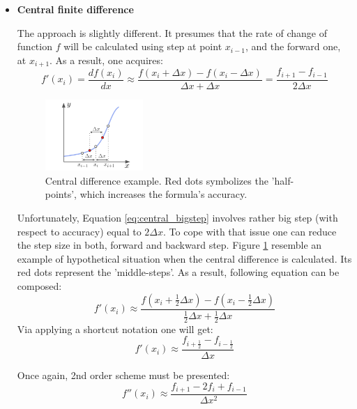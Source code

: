 \documentclass{report}
\begin{document}
\begin{itemize}
\item \textbf{Central finite difference}

The approach is slightly different. It presumes that the rate of change of function $f$ will be calculated using step at point $x_{i-1}$, and the forward one, at $x_{i+1}$. As a result, one acquires:
\begin{equation} \label{eq:central_bigstep}
f'(x_i) = \frac{df(x_i)}{dx} \approx \frac{f(x_i + \Delta x) -f(x_i - \Delta x)}{\Delta x + \Delta x} = \frac{f_{i+1} - f_{i-1}}{2\Delta x}
\end{equation}

\begin{figure}[H]
    \centering
    \includegraphics[width=0.35\textwidth]{images/central_diff.pdf}
    \caption{Central difference example. Red dots symbolizes the 'half-points', which increases the formula's accuracy.}
    \label{fig:central_diff}
\end{figure}

Unfortunately, Equation \ref{eq:central_bigstep} involves rather big step (with respect to accuracy) equal to $2\Delta x$. To cope with that issue one can reduce the step size in both, forward and backward step. Figure \ref{fig:central_diff} resemble an example of hypothetical situation when the central difference is calculated. Its red dots represent the 'middle-steps'. As a result, following equation can be composed:
\begin{equation*}
f'(x_i) \approx \frac{f(x_i + \frac{1}{2}\Delta x) -f(x_i - \frac{1}{2}\Delta x)}{\frac{1}{2}\Delta x + \frac{1}{2}\Delta x}
\end{equation*}
Via applying a shortcut notation one will get:
\begin{equation*}
f'(x_i) \approx \frac{  f_{i + \frac{1}{2}} - f_{i - \frac{1}{2}} }{\Delta x}
\end{equation*}

Once again, 2nd order scheme must be presented:
\begin{equation*}
f''(x_i) \approx \frac{f_{i+1} - 2 f_{i} + f_{i-1}}{\Delta x ^ 2}
\end{equation*}
\end{itemize}
\end{document}
